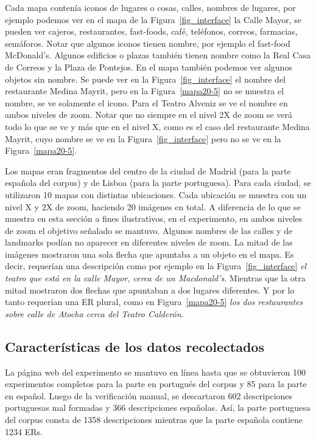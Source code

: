 Cada mapa conten\'ia iconos de lugares o cosas, calles, nombres de lugares, por ejemplo podemos ver en el mapa de la Figura~\ref{fig_interface} la Calle Mayor, se pueden ver cajeros, restaurantes, fast-foods, caf\'e, tel\'efonos, correos, farmacias, sem\'aforos. Notar que algunos iconos tienen nombre, por ejemplo el fast-food McDonald's. Algunos edificios o plazas tambi\'en tienen nombre como la Real Casa de Correos y la Plaza de Pontejos. En el mapa tambi\'en podemos ver algunos objetos sin nombre.
Se puede ver en la Figura~\ref{fig_interface} el nombre del restaurante Medina Mayrit, pero en la Figura~\ref{mapa20-5} no se muestra el nombre, se ve solamente el icono. Para el Teatro Alveniz se ve el nombre en ambos niveles de zoom. Notar que no siempre en el nivel 2X de zoom se ver\'a todo lo que se ve y m\'as que en el nivel X, como es el caso del restaurante Medina Mayrit, cuyo nombre se ve en la Figura~\ref{fig_interface} pero no se ve en la Figura~\ref{mapa20-5}.

Los mapas eran fragmentos del centro de la ciudad de Madrid (para la parte espa\~nola del corpus) y de Lisboa (para la parte portuguesa).
Para cada ciudad, se utilizaron 10 mapas con distintas ubicaciones. Cada ubicaci\'on se muestra con un nivel X y 2X de zoom, haciendo 20 im\'agenes en total. 
A diferencia de lo que se muestra en esta secci\'on a fines ilustrativos, en el experimento, en ambos niveles de zoom el objetivo se\~{n}alado se mantuvo. Algunos nombres de las calles y de landmarks pod\'{i}an no aparecer en diferentes niveles de zoom.
La mitad de las im\'agenes mostraron una sola flecha que apuntaba a un objeto en el mapa. Es decir, requer\'{i}an una descripci\'on como por ejemplo en la Figura~\ref{fig_interface} {\it el teatro que est\'a en la calle Mayor, cerca de un Macdonald's}. Mientras que la otra mitad mostraron dos flechas que apuntaban a dos lugares diferentes. Y por lo tanto requer\'ian una ER plural, como en Figura~\ref{mapa20-5} {\it los dos restaurantes sobre calle de Atocha cerca del Teatro Calder\'on}.


\subsection{Caracter\'isticas de los datos recolectados}
\label{sec:datos_recolectados}

La p\'agina web del experimento se mantuvo en l\'{i}nea hasta que se obtuvieron 100 experimentos completos para la parte en portugu\'es del corpus y 85  para la parte en espa\~nol. Luego de la verificaci\'on manual, se descartaron 602 descripciones portuguesas mal formadas y 366 descripciones espa\~nolas. As\'{i}, la parte portuguesa del corpus consta de 1358 descripciones mientras que la parte espa\~nola contiene 1234 ERs. 

